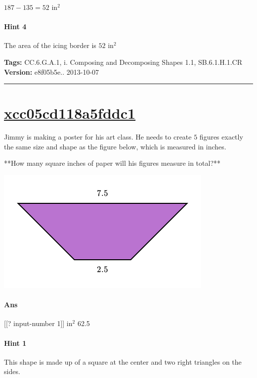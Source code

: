 \documentclass[twocolumn,10pt]{article}
\def\shrinkfactor{0.55}
\begin{document}
$187-135=52\text{ in}^2$ 

\paragraph{Hint 4}The area of the icing border is $52\text{ in}^2$ 



\medskip
\noindent
\textbf{Tags:} {\footnotesize CC.6.G.A.1, i.	Composing and Decomposing Shapes 1.1, SB.6.1.H.1.CR}\\
\textbf{Version:} e8f05b5e.. 2013-10-07
\smallskip\hrule





\section{\href{https://www.khanacademy.org/devadmin/content/items/xcc05cd118a5fddc1}{xcc05cd118a5fddc1}}

\noindent
Jimmy is making a poster for his art class.  He needs to create $5$ figures exactly the same size and shape as the figure below, which is measured in inches.  
 
**How many square inches of paper will his figures measure in total?**  


\includegraphics[scale=\shrinkfactor]{figures/d8e846758f0427dfe7d64fa8f4fdad52e39d7b3c.png}

\paragraph{Ans}  [[? input-number 1]] $\text{in}^2$  62.5

\paragraph{Hint 1}This shape is made up of a square at the center and two right triangles on the sides.   
\end{document}
